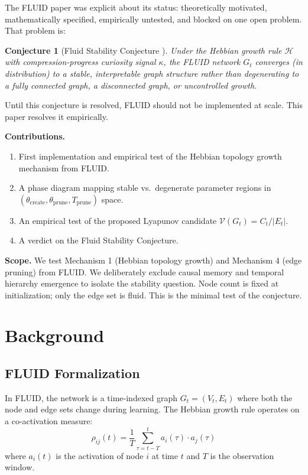 \documentclass[12pt]{article}
\newtheorem{conjecture}{Conjecture}
\begin{document}
The FLUID paper was explicit about its status: theoretically motivated, mathematically specified, empirically untested, and blocked on one open problem. That problem is:

\begin{conjecture}[Fluid Stability Conjecture \cite{lin2026fluid}]
Under the Hebbian growth rule $\mathcal{H}$ with compression-progress curiosity signal $\kappa$, the FLUID network $G_t$ converges (in distribution) to a stable, interpretable graph structure rather than degenerating to a fully connected graph, a disconnected graph, or uncontrolled growth.
\end{conjecture}

Until this conjecture is resolved, FLUID should not be implemented at scale. This paper resolves it empirically.

\textbf{Contributions.}
\begin{enumerate}
    \item First implementation and empirical test of the Hebbian topology growth mechanism from FLUID.
    \item A phase diagram mapping stable vs.\ degenerate parameter regions in $(\theta_{\text{create}}, \theta_{\text{prune}}, T_{\text{prune}})$ space.
    \item An empirical test of the proposed Lyapunov candidate $\mathcal{V}(G_t) = C_t / |E_t|$.
    \item A verdict on the Fluid Stability Conjecture.
\end{enumerate}

\textbf{Scope.} We test Mechanism 1 (Hebbian topology growth) and Mechanism 4 (edge pruning) from FLUID. We deliberately exclude causal memory \cite{pearl2009} and temporal hierarchy emergence to isolate the stability question. Node count is fixed at initialization; only the edge set is fluid. This is the minimal test of the conjecture.

\section{Background}

\subsection{FLUID Formalization}

In FLUID, the network is a time-indexed graph $G_t = (V_t, E_t)$ where both the node and edge sets change during learning. The Hebbian growth rule \cite{hebb1949} operates on a co-activation measure:
\begin{equation}
\rho_{ij}(t) = \frac{1}{T} \sum_{\tau=t-T}^{t} a_i(\tau) \cdot a_j(\tau)
\end{equation}
where $a_i(t)$ is the activation of node $i$ at time $t$ and $T$ is the observation window.
\end{document}
